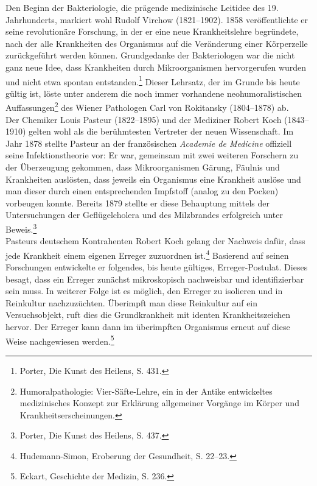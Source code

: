 \documentclass[
    a4paper,
    12pt,
    hyphens,
    chapterprefix=true,
    headheight=33pt,
    footheight=29pt,
    headings=optiontohead, %
]{scrartcl}
\begin{document}
Den Beginn der Bakteriologie, die prägende medizinische Leitidee des 19. Jahrhunderts, markiert wohl Rudolf Virchow (1821--1902). 1858 veröffentlichte er seine revolutionäre Forschung, in der er eine neue Krankheitslehre begründete, nach der alle Krankheiten des Organismus auf die Veränderung einer Körperzelle zurückgeführt werden können. Grundgedanke der Bakteriologen war die nicht ganz neue Idee, dass Krankheiten durch Mikroorganismen hervorgerufen wurden und nicht etwa spontan entstanden.\footnote{Porter, Die Kunst des Heilens, S. 431.} Dieser Lehrsatz, der im Grunde bis heute gültig ist, löste unter anderem die noch immer vorhandene neohumoralistischen Auffassungen\footnote{Humoralpathologie: Vier-Säfte-Lehre, ein in der Antike entwickeltes medizinisches Konzept zur Erklärung allgemeiner Vorgänge im
Körper und Krankheitserscheinungen.} des Wiener Pathologen Carl von Rokitansky (1804--1878) ab.\\
Der Chemiker Louis Pasteur (1822--1895) und der Mediziner Robert Koch (1843--1910) gelten wohl als die berühmtesten Vertreter der neuen Wissenschaft. Im Jahr 1878 stellte Pasteur an der französischen \textit{Academie de Medicine} offiziell seine Infektionstheorie vor: Er war, gemeinsam mit zwei weiteren Forschern zu der Überzeugung gekommen, dass Mikroorganismen Gärung, Fäulnis und Krankheiten auslösten, dass jeweils ein Organismus eine Krankheit auslöse und man dieser durch einen entsprechenden Impfstoff (analog zu den Pocken) vorbeugen konnte. Bereits 1879 stellte er diese Behauptung mittels der Untersuchungen der Geflügelcholera und des Milzbrandes erfolgreich unter Beweis.\footnote{Porter, Die Kunst des Heilens, S. 437.}\\
Pasteurs deutschem Kontrahenten Robert Koch gelang der Nachweis dafür, dass jede Krankheit einem eigenen Erreger zuzuordnen ist.\footnote{Hudemann-Simon, Eroberung der Gesundheit, S. 22--23.} Basierend auf seinen Forschungen entwickelte er folgendes, bis heute gültiges, Erreger-Postulat. Dieses besagt, dass ein Erreger zunächst mikroskopisch nachweisbar und identifizierbar sein muss. In weiterer Folge ist es möglich, den Erreger zu isolieren und in Reinkultur nachzuzüchten. Überimpft man diese Reinkultur auf ein Versuchsobjekt, ruft dies die Grundkrankheit mit identen Krankheitszeichen hervor. Der Erreger kann dann im überimpften Organismus erneut auf diese Weise nachgewiesen werden.\footnote{Eckart, Geschichte der Medizin, S. 236.}
\end{document}
